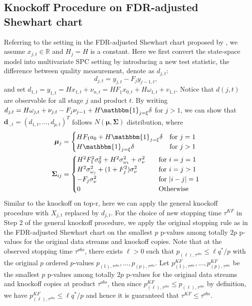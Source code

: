 \documentclass[]{interact}
\theoremstyle{plain}%
\theoremstyle{definition}
\theoremstyle{remark}
\begin{document}
\subsection{Knockoff Procedure on FDR-adjusted Shewhart chart}
Referring to the setting in the FDR-adjusted Shewhart chart proposed by \cite{li2009false}, we assume $x_{j,t}\in\mathbb{R}$ and $H_j=H$ is a constant. Here we first convert the state-space model into multivariate SPC setting by introducing a new test statistic, the difference between quality measurement, denote as $d_{j,t}$:
\begin{equation}\label{diff}
d_{j,t} = y_{j,t} - F_j y_{j-1,t},
\end{equation}
and set $d_{1,t} = y_{1,t} = H x_{1,t} + \nu_{n,t} = H F_1 x_{0,t} + H \omega_{1,t}+v_{1,t}$. Notice that $d(j,t)$ are observable for all stage $j$ and product $t$. By writing $d_{j,t} = H \omega_{j,t} + \nu_{j,t} - F_j \nu_{j-1} + H \mathbbm{1}_{j=\xi} \delta$ for $j>1$, we can show that $\mathbf{d}_{\cdot,t}=(d_{1,t},\ldots,d_{p,t})^T$ follows $N(\bm\mu,\bm\Sigma)$ distribution, where 
\begin{align*}
\bm \mu_{j} &= 
\begin{cases}
H F_1 a_0 + H \mathbbm{1}_{j=\xi} \delta & \text{for }j = 1 \\
H \mathbbm{1}_{j=\xi} \delta & \text{for }j > 1
\end{cases} \\
\bm \Sigma_{ij} &=
\begin{cases}
H^2 F_1^2 \sigma_0^2 + H^2 \sigma^2_{\omega_1}  + \sigma^2_{\nu} & \quad \text{for }i = j =1\\
H^2 \sigma^2_{\omega_j} +(1 + F_j^2 ) \sigma^2_{\nu} &\quad \text{for } i=j>1 \\
- F_j \sigma^2_{\nu} &\quad \text{for } |i-j| =1\\
0& \quad \text{Otherwise}
\end{cases}
\end{align*}
Similar to the knockoff on top-r, here we can apply the general knockoff procedure with $X_{j,t}$ replaced by $d_{j,t}$. For the choice of new stopping time $\tau^{KF}$ in Step 2 of the general knockoff procedure, we apply the original stopping rule as in the FDR-adjusted Shewhart chart on the smallest $p$ p-values among totally $2p$ p-values for the original data streams and knockoff copies. Note that at the observed stopping time $\tau^{obs}$, there exists $\ell>0$ such that $p_{(\ell),\tau^{obs}}\leq \ell q^*/p$ with the original $p$ ordered $p$-values $p_{(1),\tau^{obs}},\ldots,p_{(p),\tau^{obs}}$. Let $p_{(1),\tau^{obs}}^{KF},\ldots,p_{(p),\tau^{obs}}^{KF}$ be the smallest $p$ p-values among totally $2p$ p-values for the original data streams and knockoff copies at product $\tau^{obs}$, then since $p_{(\ell),\tau^{obs}}^{KF}\leq p_{(\ell),\tau^{obs}}$ by definition, we have $p_{(\ell),\tau^{obs}}^{KF}\leq \ell q^*/p$ and hence it is guaranteed that $\tau^{KF} \le \tau^{obs}$. 
\end{document}
